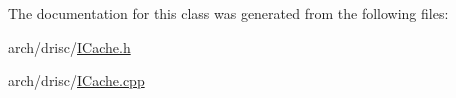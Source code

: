 The documentation for this class was generated from the following files\+:\begin{DoxyCompactItemize}
\item 
arch/drisc/\hyperlink{_i_cache_8h}{I\+Cache.\+h}\item 
arch/drisc/\hyperlink{_i_cache_8cpp}{I\+Cache.\+cpp}\end{DoxyCompactItemize}
